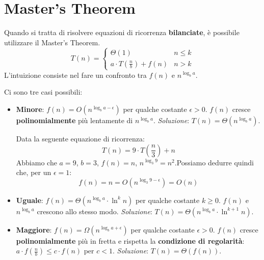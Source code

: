 
\part {Master's Theorem}
Quando si tratta di risolvere equazioni di ricorrenza \textbf{bilanciate}, è possibile utilizzare il Master's Theorem.
\begin{equation}
	T(n)=\begin{cases}
		\Theta(1) & n \leq k \\
		a \cdot T(\frac{n}{b}) + f(n) & n >k
	\end{cases}
\end{equation}
L'intuizione consiste nel fare un confronto tra $f(n)$ e $n^{\log_b{a}}$.

\begin{definition}
Ci sono tre casi possibili:
\begin{itemize}
	\item \textbf{Minore}: $f(n) = O(n^{\log_b{a}-\epsilon})$ per qualche costante $\epsilon > 0$.
	$f(n)$ cresce \textbf{polinomialmente} più lentamente di $n^{\log_b{a}}$.
	\emph{Soluzione}: $T(n) = \Theta(n^{\log_b{a}})$.
	
	\begin{example}
		Data la seguente equazione di ricorrenza:
		\begin{equation}
			T(n) = 9 \cdot T(\frac{n}{3}) + n
		\end{equation}
		Abbiamo che $a=9$, $b=3$, $f(n) = n$, $n^{\log_3 9} = n^2$.Possiamo dedurre quindi che, per un $\epsilon = 1$:
		\begin{equation}
			f(n)  = n = O(n^{\log_3 9 - \epsilon}) = O(n)
		\end{equation}
	\end{example}
    
	\item \textbf{Uguale}: $f(n) = \Theta(n^{\log_b{a}}\cdot \ln^k{n})$ per qualche costante $k \geq 0$.
	$f(n)$ e $n^{\log_b{a}}$ crescono allo stesso modo.
	\emph{Soluzione}: $T(n) = \Theta(n^{\log_b{a}} \cdot \ln^{k+1}{n})$.
	
	\item \textbf{Maggiore}: $f(n) = \Omega(n^{\log_b{a} + \epsilon})$ per qualche costante $\epsilon > 0$.
	$f(n)$ cresce \textbf{polinomialmente} più in fretta e rispetta la \textbf{condizione di regolarità}: $a \cdot f(\frac{n}{b}) \leq c \cdot f(n)$ per $c<1$.
	\emph{Soluzione}: $T(n) = \Theta(f(n))$.
\end{itemize}
\end{definition}


